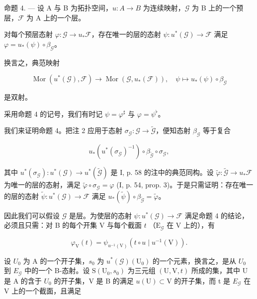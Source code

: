 命题 4. --- 设 A 与 B 为拓扑空间，\(u\colon A\to B\) 为连续映射，\(\mathcal{G}\) 为 B 上的一个预层，\(\mathcal{F}\) 为 A 上的一个层。

对每个预层态射 \(\varphi\colon\mathcal{G}\to u_{*}\mathcal{F}\)，存在唯一的层的态射 \(\psi\colon u^{*}(\mathcal{G})\to\mathcal{F}\) 满足 \(\varphi=u_{*}(\psi)\circ\beta_{\mathcal{G}}\)。

换言之，典范映射

\[
\operatorname{Mor} \left(u ^ {*} (\mathcal {G}), \mathcal {F}\right)\rightarrow \operatorname{Mor} \left(\mathcal {G}, u _ {*} (\mathcal {F})\right), \quad \psi \mapsto u _ {*} (\psi) \circ \beta_ {\mathcal {G}}
\]

是双射。

采用命题 4 的记号，我们有时记 \(\psi = \varphi^{\sharp}\) 与 \(\varphi = \psi^{\flat}\)。

我们来证明命题 4。把注 2 应用于态射 \(\sigma_{\mathcal{G}}: \mathcal{G} \to \widetilde{\mathcal{G}}\)，便知态射 \(\beta_{\mathcal{G}}\) 等于复合

\[
u _ {*} (u ^ {*} (\sigma_ {\mathcal {G}}) ^ {- 1}) \circ \beta_ {\widetilde {\mathcal {G}}} \circ \sigma_ {\mathcal {G}},
\]

其中 \(u^{*}(\sigma_{\mathcal{G}}) \colon u^{*}(\mathcal{G}) \to u^{*}(\widetilde{\mathcal{G}})\) 是 I, p. 58 的注中的典范同构。设 \(\widetilde{\varphi} \colon \widetilde{\mathcal{G}} \to u_{*}\mathcal{F}\) 为唯一的层的态射，满足 \(\widetilde{\varphi} \circ \sigma_{\mathcal{G}} = \varphi\) (I, p. 54, prop. 3)。于是只需证明：存在唯一的层的态射 \(\widetilde{\psi} \colon u^{*}(\mathcal{G}) \to \mathcal{F}\) 满足 \(u_{*}(\widetilde{\psi}) \circ \beta_{\widetilde{\mathcal{G}}} = \widetilde{\varphi}\)。

因此我们可以假设 \(\mathcal{G}\) 是层。为使层的态射 \(\psi: u^{*}(\mathcal{G}) \to \mathcal{F}\) 满足命题 4 的结论，必须且只需：对 B 的每个开集 V 与每个截面 \(t\) （\(\mathrm{E}_{\mathcal{G}}\) 在 V 上的），有

\[
\varphi_{\mathrm{V}}(t) = \psi_{u^{-1}(\mathrm{V})}(t \circ u \mid u^{-1}(\mathrm{V})).\tag{6}
\]

设 \(U_{0}\) 为 A 的一个开子集，\(s_{0}\) 为 \(u^{*}(\mathcal{G})(\mathrm{U}_{0})\) 的一个元素，换言之，是从 \(U_{0}\) 到 \(E_{\mathcal{G}}\) 中的一个 B-态射。设 \(\mathrm{S}(\mathrm{U}_{0}, s_{0})\) 为三元组 \((\mathrm{U}, \mathrm{V}, t)\) 所成的集，其中 U 是 A 的含于 \(U_{0}\) 的开子集，V 是 B 的满足 \(u(\mathrm{U}) \subset \mathrm{V}\) 的开子集，而 t 是 \(E_{\mathcal{G}}\) 在 V 上的一个截面，且满足

